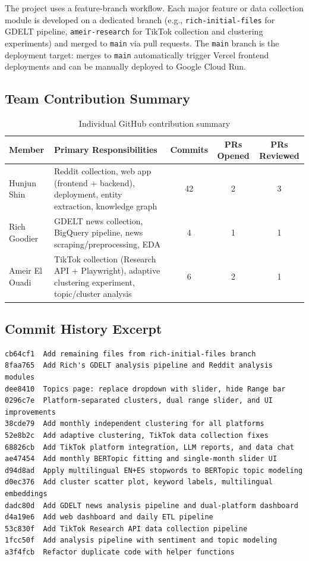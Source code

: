 \documentclass[12pt, letterpaper]{article}
\begin{document}
The project uses a feature-branch workflow. Each major feature or data collection module is developed on a dedicated branch (e.g., \texttt{rich-initial-files} for GDELT pipeline, \texttt{ameir-research} for TikTok collection and clustering experiments) and merged to \texttt{main} via pull requests. The \texttt{main} branch is the deployment target: merges to \texttt{main} automatically trigger Vercel frontend deployments and can be manually deployed to Google Cloud Run.

\subsection{Team Contribution Summary}
\begin{table}[H]
  \centering
  \caption{Individual GitHub contribution summary}
  \label{tab:git_contributions}
  \begin{tabularx}{\linewidth}{lXccc}
    \toprule
    \textbf{Member} & \textbf{Primary Responsibilities} & \textbf{Commits} & \textbf{PRs Opened} & \textbf{PRs Reviewed} \\
    \midrule
    Hunjun Shin    & Reddit collection, web app (frontend + backend), deployment, entity extraction, knowledge graph & 42 & 2 & 3 \\
    Rich Goodier   & GDELT news collection, BigQuery pipeline, news scraping/preprocessing, EDA & 4  & 1 & 1 \\
    Ameir El Ouadi & TikTok collection (Research API + Playwright), adaptive clustering experiment, topic/cluster analysis & 6  & 2 & 1 \\
    \bottomrule
  \end{tabularx}
\end{table}

\subsection{Commit History Excerpt}
\begin{lstlisting}[style=gitlog, caption={Recent commit log (git log --oneline)}, label=lst:gitlog]
cb64cf1  Add remaining files from rich-initial-files branch
8faa765  Add Rich's GDELT analysis pipeline and Reddit analysis modules
dee8410  Topics page: replace dropdown with slider, hide Range bar
0296c7e  Platform-separated clusters, dual range slider, and UI improvements
38cde79  Add monthly independent clustering for all platforms
52e8b2c  Add adaptive clustering, TikTok data collection fixes
68826cb  Add TikTok platform integration, LLM reports, and data chat
ae47454  Add monthly BERTopic fitting and single-month slider UI
d94d8ad  Apply multilingual EN+ES stopwords to BERTopic topic modeling
d0ec376  Add cluster scatter plot, keyword labels, multilingual embeddings
dadc80d  Add GDELT news analysis pipeline and dual-platform dashboard
d4a19e6  Add web dashboard and daily ETL pipeline
53c830f  Add TikTok Research API data collection pipeline
1fcc50f  Add analysis pipeline with sentiment and topic modeling
a3f4fcb  Refactor duplicate code with helper functions
\end{lstlisting}
\end{document}
